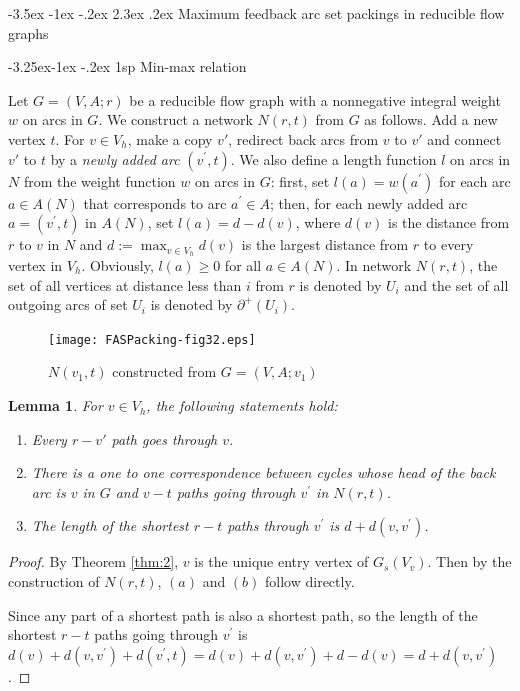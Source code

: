 \documentclass[11pt]{article}
\makeatletter
\newtheorem{lemma}[theorem]{Lemma}
\renewcommand\section{%
  \@startsection{section}{1}
                {\z@}%
                {-3.5ex \@plus -1ex \@minus -.2ex}%
                {2.3ex \@plus.2ex}%
                {\large\bfseries}%
}
\renewcommand\subsection{%
  \@startsection{subsection}{2}
                {\z@}%
                {-3.25ex\@plus -1ex \@minus -.2ex}%
                {1sp}%
                {\normalsize\bfseries}%
}
\makeatother
\begin{document}
\section{Maximum feedback arc set packings in reducible flow graphs}
\label{sec:3}

\subsection{Min-max relation}
\label{sec:4}

Let $G=(V,A;r)$ be a reducible flow graph with a nonnegative integral weight $w$ on arcs in $G$. We construct a network $N(r,t)$ from $G$ as follows. Add a new vertex $t$. For $v\in V_h$, make a copy $v'$, redirect back arcs from $v$ to $v'$ and connect $v'$ to $t$ by a \emph{newly added arc} $(v^\prime,t)$. 
We also define a length function $l$ on arcs in $N$ from the weight function $w$ on arcs in $G$: first, set $l(a)=w(a^\prime)$ for each arc $a\in A(N)$ that corresponds to arc $a^\prime\in A$; then, for each newly added arc $a=(v^\prime,t)$ in $A(N)$, set $l(a)=d-d(v)$, where $d(v)$ is the distance from $r$ to $v$ in $N$ and $d:=\max_{v\in V_h} d(v)$ is the largest distance from $r$ to every vertex in $V_h$. Obviously, $l(a)\geq 0$ for all $a\in A(N)$. In network $N(r,t)$, the set of all vertices at distance less than $i$ from $r$ is denoted by $U_i$ and the set of all outgoing arcs of set $U_i$ is denoted by $\partial^+(U_i)$.

\begin{figure}
    \centering
    \texttt{[image: FASPacking-fig32.eps]}
    \caption{$N(v_1,t)$ constructed from $G=(V,A;v_1)$}
     \label{fig:3}
 \end{figure}

\begin{lemma}
\label{lem:2}
For $v\in V_h$, the following statements hold:
\begin{enumerate}[label=\emph{(}\alph*\emph{)}]
  \item Every $r-v'$ path goes through $v$.
  \item There is a one to one correspondence between cycles whose head of the back arc is $v$ in $G$ and $v-t$ paths going through $v^\prime$ in $N(r,t)$. 
  \item The length of the shortest $r-t$ paths through $v^\prime$ is $d+d(v,v^\prime)$.
\end{enumerate}
\end{lemma}
\begin{proof}
By Theorem \ref{thm:2}, $v$ is the unique entry vertex of $G_s(V_v)$. Then by the construction of $N(r,t)$, $(a)$ and $(b)$ follow directly.

Since any part of a shortest path is also a shortest path, so the length of the shortest $r-t$ paths going through $v^\prime$ is $d(v)+d(v,v^\prime)+d(v^\prime,t)=d(v)+d(v,v^\prime)+d-d(v)=d+d(v,v^\prime)$.
\end{proof}
\end{document}
